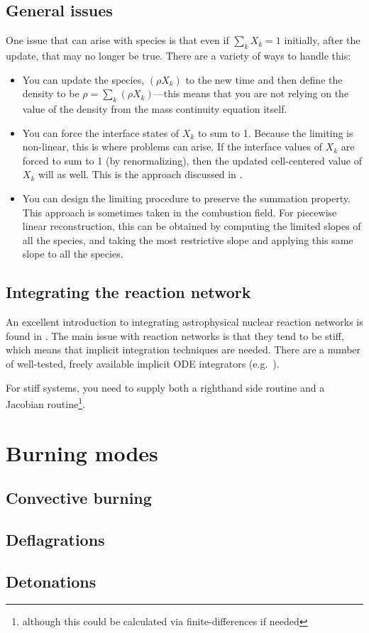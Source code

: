 \subsection{General issues}

One issue that can arise with species is that even if $\sum_k X_k = 1$
initially, after the update, that may no longer be true.  There are a
variety of ways to handle this:
\begin{itemize}
\item You can update the species, $(\rho X_k)$ to the new time and then
define the density to be $\rho = \sum_k (\rho X_k)$---this means that
you are not relying on the value of the density from the mass continuity
equation itself.

\item You can force the interface states of $X_k$ to sum to 1.  Because
the limiting is non-linear, this is where problems can arise.  If the
interface values of $X_k$ are forced to sum to 1 (by renormalizing), then
the updated cell-centered value of $X_k$ will as well.  This is the
approach discussed in \cite{plewamuller:1999}.

\item You can design the limiting procedure to preserve the summation
property.  This approach is sometimes taken in the combustion field.
For piecewise linear reconstruction, this can be obtained by computing
the limited slopes of all the species, and taking the most restrictive
slope and applying this same slope to all the species.
\end{itemize}


\subsection{Integrating the reaction network}

An excellent introduction to integrating astrophysical nuclear
reaction networks is found in \cite{timmes_nets}.  The main issue with
reaction networks is that they tend to be stiff, which means that
implicit integration techniques are needed.  There are a number of
well-tested, freely available implicit ODE integrators
(e.g.~\cite{vode}).

For stiff systems, you need to supply both a righthand side routine
and a Jacobian routine\footnote{although this could be calculated via
  finite-differences if needed}.


\section{Burning modes}

\subsection{Convective burning}


\subsection{Deflagrations}


\subsection{Detonations}

